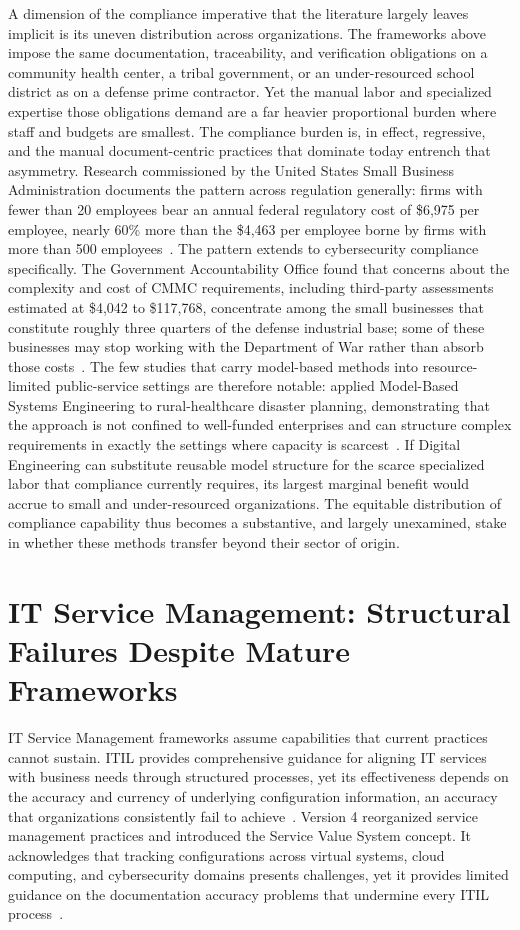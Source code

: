 A dimension of the compliance imperative that the literature largely leaves implicit is its uneven distribution across organizations. The frameworks above impose the same documentation, traceability, and verification obligations on a community health center, a tribal government, or an under-resourced school district as on a defense prime contractor. Yet the manual labor and specialized expertise those obligations demand are a far heavier proportional burden where staff and budgets are smallest. The compliance burden is, in effect, regressive, and the manual document-centric practices that dominate today entrench that asymmetry. Research commissioned by the United States Small Business Administration documents the pattern across regulation generally: firms with fewer than 20 employees bear an annual federal regulatory cost of \$6,975 per employee, nearly 60\% more than the \$4,463 per employee borne by firms with more than 500 employees~\parencite{Crain_Hopkins_2001}. The pattern extends to cybersecurity compliance specifically. The Government Accountability Office found that concerns about the complexity and cost of CMMC requirements, including third-party assessments estimated at \$4,042 to \$117,768, concentrate among the small businesses that constitute roughly three quarters of the defense industrial base; some of these businesses may stop working with the Department of War rather than absorb those costs~\parencite{GAO_CMMC_2026}.
The few studies that carry model-based methods into resource-limited public-service settings are therefore notable: \citeauthor{Berg_2023} applied Model-Based Systems Engineering to rural-healthcare disaster planning, demonstrating that the approach is not confined to well-funded enterprises and can structure complex requirements in exactly the settings where capacity is scarcest~\parencite{Berg_2023}. If Digital Engineering can substitute reusable model structure for the scarce specialized labor that compliance currently requires, its largest marginal benefit would accrue to small and under-resourced organizations. The equitable distribution of compliance capability thus becomes a substantive, and largely unexamined, stake in whether these methods transfer beyond their sector of origin.

\section{IT Service Management: Structural Failures Despite Mature Frameworks}

IT Service Management frameworks assume capabilities that current practices cannot sustain. ITIL provides comprehensive guidance for aligning IT services with business needs through structured processes, yet its effectiveness depends on the accuracy and currency of underlying configuration information, an accuracy that organizations consistently fail to achieve~\parencite{Cannon_AXELOS_2013}. Version 4 reorganized service management practices and introduced the Service Value System concept. It acknowledges that tracking configurations across virtual systems, cloud computing, and cybersecurity domains presents challenges, yet it provides limited guidance on the documentation accuracy problems that undermine every ITIL process~\parencite{ITIL_4_2019}.

